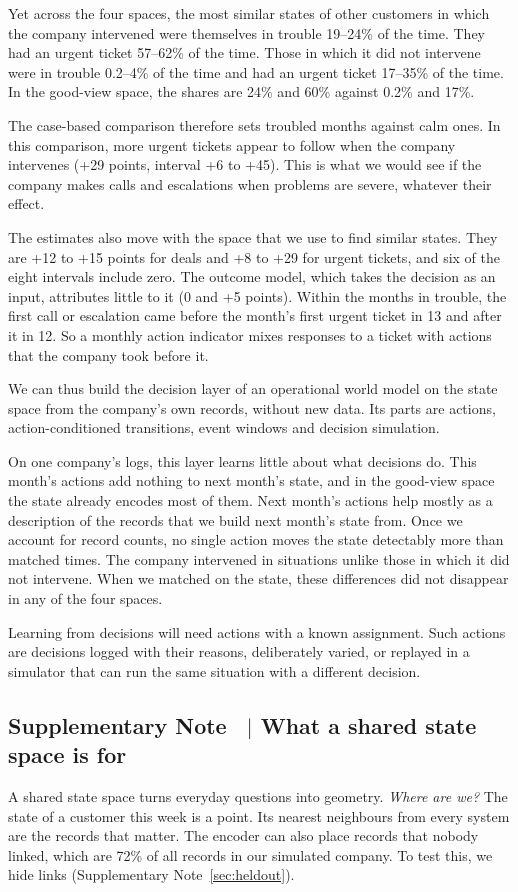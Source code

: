 \documentclass[11pt]{article}
\newcounter{suppnote}
\newcommand{\suppnote}[2]{\refstepcounter{suppnote}\label{#2}\subsection{Supplementary Note \thesuppnote\ $|$ #1}}
\begin{document}
Yet across the four spaces, the most similar states of other customers in which the company intervened were themselves in trouble 19--24\% of the time. They had an urgent ticket 57--62\% of the time. Those in which it did not intervene were in trouble 0.2--4\% of the time and had an urgent ticket 17--35\% of the time. In the good-view space, the shares are 24\% and 60\% against 0.2\% and 17\%.

The case-based comparison therefore sets troubled months against calm ones. In this comparison, more urgent tickets appear to follow when the company intervenes (+29 points, interval +6 to +45). This is what we would see if the company makes calls and escalations when problems are severe, whatever their effect.

The estimates also move with the space that we use to find similar states. They are +12 to +15 points for deals and +8 to +29 for urgent tickets, and six of the eight intervals include zero. The outcome model, which takes the decision as an input, attributes little to it (0 and +5 points). Within the months in trouble, the first call or escalation came before the month's first urgent ticket in 13 and after it in 12. So a monthly action indicator mixes responses to a ticket with actions that the company took before it.

We can thus build the decision layer of an operational world model on the state space from the company's own records, without new data. Its parts are actions, action-conditioned transitions, event windows and decision simulation.

On one company's logs, this layer learns little about what decisions do. This month's actions add nothing to next month's state, and in the good-view space the state already encodes most of them. Next month's actions help mostly as a description of the records that we build next month's state from. Once we account for record counts, no single action moves the state detectably more than matched times. The company intervened in situations unlike those in which it did not intervene. When we matched on the state, these differences did not disappear in any of the four spaces.

Learning from decisions will need actions with a known assignment. Such actions are decisions logged with their reasons, deliberately varied, or replayed in a simulator that can run the same situation with a different decision.

\suppnote{What a shared state space is for}{sec:whatfor}
A shared state space turns everyday questions into geometry.
\emph{Where are we?} The state of a customer this week is a point. Its nearest neighbours from every system are the records that matter. The encoder can also place records that nobody linked, which are 72\% of all records in our simulated company. To test this, we hide links (Supplementary Note~\ref{sec:heldout}).
\end{document}

